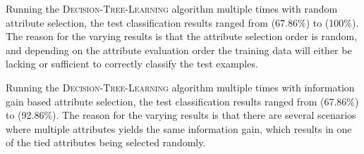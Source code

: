 Running the \textsc{Decision-Tree-Learning} algorithm multiple times with random attribute selection, the test classification results ranged from  (67.86\%) to  (100\%). The reason for the varying results is that the attribute selection order is random, and depending on the attribute evaluation order the training data will either be lacking or sufficient to correctly classify the test examples.

Running the \textsc{Decision-Tree-Learning} algorithm multiple times with information gain based attribute selection, the test classification results ranged from  (67.86\%) to  (92.86\%). The reason for the varying results is that there are several scenarios where multiple attributes yields the same information gain, which results in one of the tied attributes being selected randomly.



